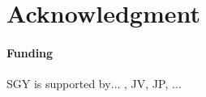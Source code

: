 \documentclass{bioinfo}
\begin{document}
\section*{Acknowledgment}

\paragraph{Funding\textcolon} SGY is supported by$\ldots$ , JV, JP, $\ldots$

%

%

\end{document}
